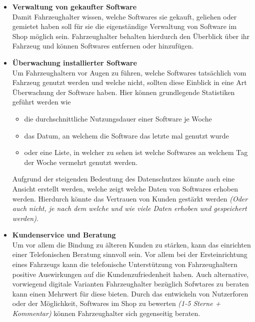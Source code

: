 \begin{itemize}
	\item[] \hspace{-0.6cm} \textbf{Verwaltung von gekaufter Software}\\
	Damit Fahrzeughalter wissen, welche Softwares sie gekauft, geliehen oder gemietet haben soll für sie die eigenständige Verwaltung von Software im Shop möglich sein. Fahrzeughalter behalten hierdurch den Überblick über ihr Fahrzeug und können Softwares entfernen oder hinzufügen.
	
	\item[] \hspace{-0.6cm} \textbf{Überwachung installierter Software}\\
	Um Fahrzeughaltern vor Augen zu führen, welche Softwares tatsächlich vom Fahrzeug genutzt werden und welche nicht, sollten diese Einblick in eine Art Überwachung der Software haben. Hier können grundlegende Statistiken geführt werden wie
	\begin{itemize}
		\item die durchschnittliche Nutzungsdauer einer Software je Woche
		\item das Datum, an welchem die Software das letzte mal genutzt wurde
		\item oder eine Liste, in welcher zu sehen ist welche Softwares an welchem Tag der Woche vermehrt genutzt werden.
	\end{itemize}
	Aufgrund der steigenden Bedeutung des Datenschutzes könnte auch eine Ansicht erstellt werden, welche zeigt welche Daten von Softwares erhoben werden. Hierdurch könnte das Vertrauen von Kunden gestärkt werden \textit{(Oder auch nicht, je nach dem welche und wie viele Daten erhoben und gespeichert werden)}.
	
	\item[] \hspace{-0.6cm} \textbf{Kundenservice und Beratung}\\
	Um vor allem die Bindung zu älteren Kunden zu stärken, kann das einrichten einer Telefonischen Beratung sinnvoll sein. Vor allem bei der Ersteinrichtung eines Fahrzeugs kann die telefonische Unterstützung von Fahrzeughaltern positive Auswirkungen auf die Kundenzufriedenheit haben. Auch alternative, vorwiegend digitale Varianten Fahrzeughalter bezüglich Sofwtares zu beraten kann einen Mehrwert für diese bieten. Durch das entwickeln von Nutzerforen oder der Möglichkeit, Softwares im Shop zu bewerten \textit{(1-5 Sterne + Kommentar)} können Fahrzeughalter sich gegenseitig beraten.
\end{itemize}
